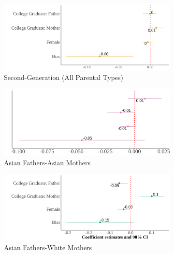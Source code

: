 \documentclass[12pt,english]{article}
\begin{document}
\begin{center}
\begin{figure}[!htb]
\centering
\caption{Relationship Between Self-Reported Asian Identity and Bias: By Parental Types}
\label{plot01-regression-byparent}
\begin{subfigure}{.48\textwidth}
\caption{Second-Generation (All Parental Types)}
\centering
\includegraphics[width=.9\linewidth]{figure/by-parents-regs-all.png}
\end{subfigure}
\centering
\begin{subfigure}{.48\textwidth}
\caption{Asian Fathers-Asian Mothers}
\centering
\includegraphics[width=.9\linewidth]{figure/by-parents-regs-hh.png}
\end{subfigure}
\begin{subfigure}{.48\textwidth}
\caption{Asian Fathers-White Mothers}
\centering
\includegraphics[width=.9\linewidth]{figure/by-parents-regs-hw.png}
\end{subfigure}
\begin{subfigure}{.48\textwidth}

\end{subfigure}
\end{figure}
\end{center}
\end{document}
